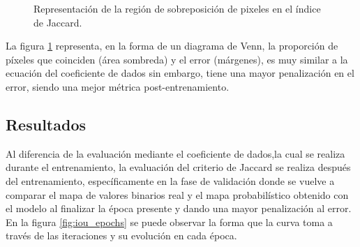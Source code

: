 \begin{figure}[h!]
    \centering
    \caption{Representación de la región de sobreposición de pixeles en el índice de Jaccard.}
    \label{fig:jacc_inter}
\end{figure}

La figura \ref{fig:jacc_inter} representa, en la forma de un diagrama de Venn, la proporción de píxeles que coinciden (área sombreda) y el error (márgenes), es muy similar a la ecuación del coeficiente de dados sin embargo, tiene una mayor penalización en el error, siendo una mejor métrica post-entrenamiento.

\subsection{Resultados}
Al diferencia de la evaluación mediante el coeficiente de dados,la cual se realiza durante el entrenamiento, la evaluación del criterio de Jaccard se realiza después del entrenamiento, específicamente en la fase de validación donde se vuelve a comparar el mapa de valores binarios real y el mapa probabilístico obtenido con el modelo al finalizar la época presente y dando una mayor penalización al error. En la figura \ref{fig:iou_epochs} se puede observar la forma que la curva toma a través de las iteraciones y su evolución en cada época.

